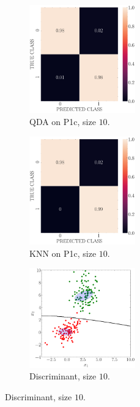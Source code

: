 \documentclass[11pt, a4 paper]{article}
\begin{document}
\begin{figure}[!htbp]
\centering
\quad
    \begin{subfigure}[!htbp]{0.24\textwidth}
       \centering
       \includegraphics[width=1.8in]{../results/ex1/conf_mtx_QD_ML_dataset_P1c_size_10.pdf}
       \caption{QDA on P1c, size $10$.}
       \label{fig:QDA_P1c_10}
    \end{subfigure}
\quad
    \begin{subfigure}[!htbp]{0.24\textwidth}
       \centering
       \includegraphics[width=1.8in]{../results/ex1/conf_mtx_KNN_dataset_P1c_size_10.pdf}
       \caption{KNN on P1c, size $10$.}
       \label{fig:KNN_P1c_10}
    \end{subfigure}
\quad
    \begin{subfigure}[!htbp]{0.24\textwidth}
       \centering
       \includegraphics[width=1.8in]{../results/ex1/samples_QD_ML_dataset_P1c_size_10.pdf}
       \caption{Discriminant, size $10$.}
       \label{fig:KNN_P1c_10}
    \end{subfigure}
    

\end{figure}
\end{document}
